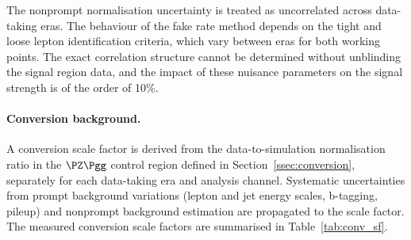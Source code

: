 The nonprompt normalisation uncertainty is treated as uncorrelated across data-taking eras. The behaviour of the fake rate method depends on the tight and loose lepton identification criteria, which vary between eras for both working points. The exact correlation structure cannot be determined without unblinding the signal region data, and the impact of these nuisance parameters on the signal strength is of the order of 10\%.

\paragraph{Conversion background.}
A conversion scale factor is derived from the data-to-simulation normalisation ratio in the $\PZ\Pgg$ control region defined in Section~\ref{ssec:conversion}, separately for each data-taking era and analysis channel. Systematic uncertainties from prompt background variations (lepton and jet energy scales, b-tagging, pileup) and nonprompt background estimation are propagated to the scale factor. The measured conversion scale factors are summarised in Table~\ref{tab:conv_sf}.


